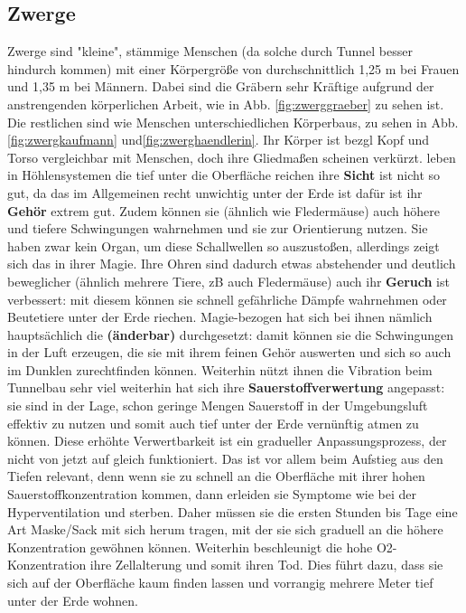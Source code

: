 \subsection{Zwerge} \label{rasse:zwerg}
\begin{outline}
	\1  Zwerge sind "kleine", stämmige Menschen (da solche durch Tunnel besser hindurch kommen) mit einer Körpergröße von durchschnittlich 1,25 m bei Frauen und 1,35 m bei Männern. Dabei sind die Gräbern sehr Kräftige aufgrund der anstrengenden körperlichen Arbeit, wie in Abb. \ref{fig:zwerggraeber} zu sehen ist. Die restlichen sind wie Menschen unterschiedlichen Körperbaus, zu sehen in Abb. \ref{fig:zwergkaufmann} und\ref{fig:zwerghaendlerin}. Ihr Körper ist bezgl Kopf und Torso vergleichbar mit Menschen, doch ihre Gliedmaßen scheinen verkürzt.
	\1 leben in Höhlensystemen die tief unter die Oberfläche reichen
	\1 ihre \textbf{Sicht} ist nicht so gut, da das im Allgemeinen recht unwichtig unter der Erde ist
	\1 dafür ist ihr \textbf{Gehör} extrem gut. Zudem können sie (ähnlich wie Fledermäuse) auch höhere und tiefere Schwingungen wahrnehmen und sie zur Orientierung nutzen. Sie haben zwar kein Organ, um diese Schallwellen so auszustoßen, allerdings zeigt sich das in ihrer Magie. Ihre Ohren sind dadurch etwas abstehender und deutlich beweglicher (ähnlich mehrere Tiere, zB auch Fledermäuse)
	\1 auch ihr \textbf{Geruch} ist verbessert: mit diesem können sie schnell gefährliche Dämpfe wahrnehmen oder Beutetiere unter der Erde riechen.
	\1 Magie-bezogen hat sich bei ihnen nämlich hauptsächlich die \textbf{ (änderbar)} durchgesetzt: damit können sie die Schwingungen in der Luft erzeugen, die sie mit ihrem feinen Gehör auswerten und sich so auch im Dunklen zurechtfinden können. Weiterhin nützt ihnen die Vibration beim Tunnelbau sehr viel
	\1 weiterhin hat sich ihre \textbf{Sauerstoffverwertung} angepasst: sie sind in der Lage, schon geringe Mengen Sauerstoff in der Umgebungsluft effektiv zu nutzen und somit auch tief unter der Erde vernünftig atmen zu können. Diese erhöhte Verwertbarkeit ist ein gradueller Anpassungsprozess, der nicht von jetzt auf gleich funktioniert. Das ist vor allem beim Aufstieg aus den Tiefen relevant, denn wenn sie zu schnell an die Oberfläche mit ihrer hohen Sauerstoffkonzentration kommen, dann erleiden sie Symptome wie bei der Hyperventilation und sterben. Daher müssen sie die ersten Stunden bis Tage eine Art Maske/Sack mit sich herum tragen, mit der sie sich graduell an die höhere Konzentration gewöhnen können. Weiterhin beschleunigt die hohe O2-Konzentration ihre Zellalterung und somit ihren Tod. Dies führt dazu, dass sie sich auf der Oberfläche kaum finden lassen  und vorrangig mehrere Meter tief unter der Erde wohnen.
\end{outline}

